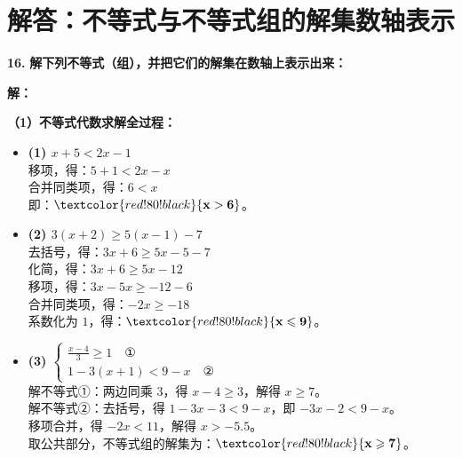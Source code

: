 \newpage

\section{解答：不等式与不等式组的解集数轴表示}

\vspace{0.6cm}

\textbf{\LARGE 16.} \textbf{解下列不等式（组），并把它们的解集在数轴上表示出来：}

\vspace{0.4cm}
\textbf{解：}

\textbf{（1）不等式代数求解全过程：}

\begin{itemize}
    \item \textbf{(1) $x + 5 < 2x - 1$} \\
    移项，得：$5 + 1 < 2x - x$ \\
    合并同类项，得：$6 < x$ \\
    即：$\textcolor{red!80!black}{\mathbf{x > 6}}$。

    \vspace{0.2cm}
    \item \textbf{(2) $3(x + 2) \geqslant 5(x - 1) - 7$} \\
    去括号，得：$3x + 6 \geqslant 5x - 5 - 7$ \\
    化简，得：$3x + 6 \geqslant 5x - 12$ \\
    移项，得：$3x - 5x \geqslant -12 - 6$ \\
    合并同类项，得：$-2x \geqslant -18$ \\
    系数化为 $1$，得：$\textcolor{red!80!black}{\mathbf{x \leqslant 9}}$。

    \vspace{0.2cm}
    \item \textbf{(3) $\begin{cases} \frac{x - 4}{3} \geqslant 1 \quad \text{①} \\ 1 - 3(x + 1) < 9 - x \quad \text{②} \end{cases}$} \\
    解不等式①：两边同乘 $3$，得 $x - 4 \geqslant 3$，解得 $x \geqslant 7$。 \\
    解不等式②：去括号，得 $1 - 3x - 3 < 9 - x$，即 $-3x - 2 < 9 - x$。 \\
    移项合并，得 $-2x < 11$，解得 $x > -5.5$。 \\
    取公共部分，不等式组的解集为：$\textcolor{red!80!black}{\mathbf{x \geqslant 7}}$。


\end{itemize}
